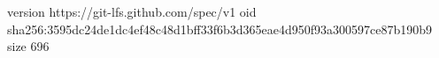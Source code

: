 version https://git-lfs.github.com/spec/v1
oid sha256:3595dc24de1dc4ef48c48d1bff33f6b3d365eae4d950f93a300597ce87b190b9
size 696
